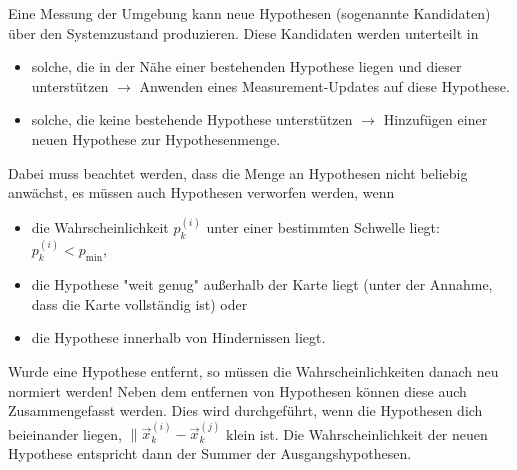 					Eine Messung der Umgebung kann neue Hypothesen (sogenannte Kandidaten) über den Systemzustand produzieren. Diese Kandidaten werden unterteilt in
					\begin{itemize}
						\item solche, die in der Nähe einer bestehenden Hypothese liegen und dieser unterstützen \( \to \) Anwenden eines Measurement-Updates auf diese Hypothese.
						\item solche, die keine bestehende Hypothese unterstützen \( \to \) Hinzufügen einer neuen Hypothese zur Hypothesenmenge.
					\end{itemize}
					Dabei muss beachtet werden, dass die Menge an Hypothesen nicht beliebig anwächst, \dh es müssen auch Hypothesen verworfen werden, \zB wenn
					\begin{itemize}
						\item die Wahrscheinlichkeit \( p_k^{(i)} \) unter einer bestimmten Schwelle liegt: \( p_k^{(i)} < p_\text{min} \),
						\item die Hypothese "weit genug" außerhalb der Karte liegt (unter der Annahme, dass die Karte vollständig ist) oder
						\item die Hypothese innerhalb von Hindernissen liegt.
					\end{itemize}
					Wurde eine Hypothese entfernt, so müssen die Wahrscheinlichkeiten danach neu normiert werden! Neben dem entfernen von Hypothesen können diese auch Zusammengefasst werden. Dies wird durchgeführt, wenn die Hypothesen dich beieinander liegen, \dh \( \big\lVert \vec{x}_k^{(i)} - \vec{x}_k^{(j)} \) klein ist. Die Wahrscheinlichkeit der neuen Hypothese entspricht dann der Summer der Ausgangshypothesen.
				
